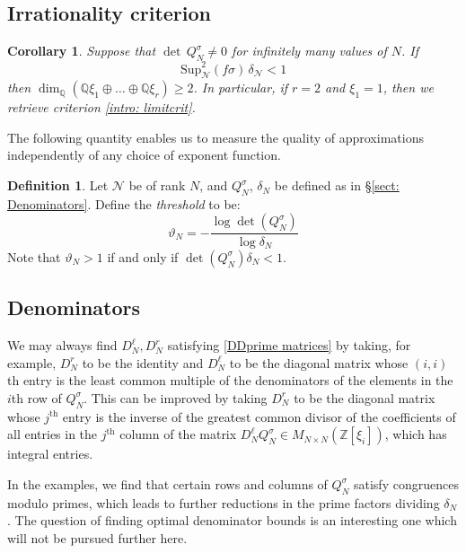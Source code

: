 \documentclass[a4paper,10pt]{amsart}
\newtheorem{cor}[thm]{Corollary}
\theoremstyle{definition}
\newtheorem{defn}[thm]{Definition}
\theoremstyle{remark}
\numberwithin{equation}{section}
\newcommand{\Z}{\mathbb Z}
\newcommand{\Q}{\mathbb Q}
\newcommand{\ts}{\mathrm{Sup}}
\newcommand{\note}[1]{{\color{blue}   #1}}
\newcommand{\0}{\color{blue}{\mathsf{0}}}
\begin{document}
 
  
  \subsection{Irrationality criterion} 
  \begin{cor}
Suppose that $\det\, Q_N^{\sigma} \neq 0$ for infinitely many values of $N$. If 
 \[    \ts^2_{\mathcal{N}}(f \sigma ) \,   \delta_{\mathcal{N}}   <1 \]  
  then $\dim_{\Q} (\Q \xi_1 \oplus \ldots \oplus \Q \xi_r) \geq 2$.  In particular, if $r=2$ and $\xi_1=1$, then we retrieve criterion \ref{intro: limitcrit}. \end{cor}
  
  
  
 The following quantity enables us to measure the quality of approximations  independently  of any choice of exponent function.
 \begin{defn}
 Let $\mathcal{N}$ be of rank $N$, and  $Q^{\sigma}_N$, $\delta_N$ be defined as   in \S \ref{sect: Denominators}.   
 Define the \emph{threshold}  to be:
 \begin{equation} \label{thetaNdef}  \vartheta_N = - \frac{  \log \det(Q^{\sigma}_N)}{\log \delta_N} \end{equation} 
Note that $\vartheta_N >1$ if and only if $\det(Q^{\sigma}_N) \delta_N <1$. 
 \end{defn} 
 
  
  
  
  \subsection{Denominators}
 We may always find $D^{\ell}_N, D^r_N$  satisfying \eqref{DDprime matrices} by taking, for example, $D^r_N$ to be the identity and $D^{\ell}_N$ to be the diagonal matrix whose $(i,i)$th  entry is the least common multiple of the denominators of the elements in the $i$th row of $Q^{\sigma}_N$. 
 This can be improved by taking $D^r_N$ to be the diagonal matrix whose $j^{\mathrm{th}}$ entry is the  inverse of the greatest common divisor of the coefficients of all entries in the $j^{\mathrm{th}}$ column of the matrix $D^{\ell}_N Q^{\sigma}_N \in M_{N\times N}(\Z[\xi_i])$, which has integral entries. 
 
 In the examples, we find that certain rows and columns of $Q^{\sigma}_N$  satisfy congruences modulo primes, which leads to further reductions in the prime factors dividing $\delta_N$. 
 The question of finding optimal denominator bounds is an interesting one which will not be pursued further here.
 
\end{document}
